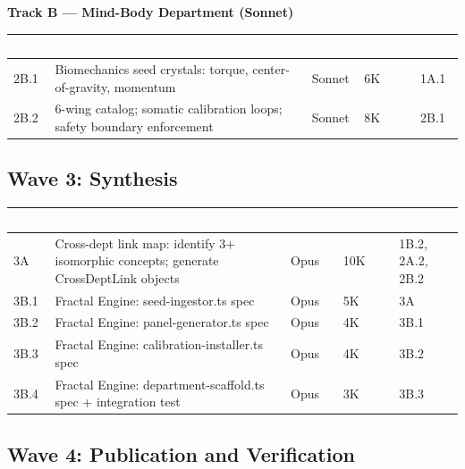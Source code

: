 \documentclass[11pt,letterpaper]{article}
\newcommand{\tableheader}[1]{\textbf{\sffamily\textcolor{white}{#1}}}
\begin{document}
\textbf{Track B --- Mind-Body Department (Sonnet)}

\begin{center}
\begin{tabularx}{\textwidth}{C{1.2cm}L{5cm}C{2cm}C{2cm}C{2cm}}
\toprule
{}
\tableheader{Task} & \tableheader{Description} & \tableheader{Model} & \tableheader{Tokens} & \tableheader{Deps} \\
\midrule
2B.1 & Biomechanics seed crystals: torque, center-of-gravity, momentum & Sonnet & 6K & 1A.1 \\
2B.2 & 6-wing catalog; somatic calibration loops; safety boundary enforcement & Sonnet & 8K & 2B.1 \\
\bottomrule
\end{tabularx}
\end{center}

\subsection{Wave 3: Synthesis}

\begin{center}
\begin{tabularx}{\textwidth}{C{1.2cm}L{5cm}C{2cm}C{2cm}C{2cm}}
\toprule
{}
\tableheader{Task} & \tableheader{Description} & \tableheader{Model} & \tableheader{Tokens} & \tableheader{Deps} \\
\midrule
3A & Cross-dept link map: identify 3+ isomorphic concepts; generate CrossDeptLink objects & Opus & 10K & 1B.2, 2A.2, 2B.2 \\
3B.1 & Fractal Engine: seed-ingestor.ts spec & Opus & 5K & 3A \\
3B.2 & Fractal Engine: panel-generator.ts spec & Opus & 4K & 3B.1 \\
3B.3 & Fractal Engine: calibration-installer.ts spec & Opus & 4K & 3B.2 \\
3B.4 & Fractal Engine: department-scaffold.ts spec + integration test & Opus & 3K & 3B.3 \\
\bottomrule
\end{tabularx}
\end{center}

\subsection{Wave 4: Publication and Verification}
\end{document}
